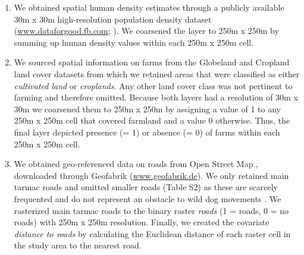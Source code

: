 \documentclass[abstract=off,10pt,a4paper,bibliography=totocnumbered]{article}
\begin{document}
\begin{enumerate}[label = (\arabic*)]

  \item We obtained spatial human density estimates through a publicly available
  30m x 30m high-resolution population density dataset
  (\url{www.dataforgood.fb.com}; \citealp{Facebook.2019}). We coarsened the
  layer to 250m x 250m by summing up human density values within each 250m x
  250m cell.

  \item We sourced spatial information on farms from the Globeland
  \citep{Chen.2015} and Cropland \citep{Xiong.2017} land cover datasets from
  which we retained areas that were classified as either \textit{cultivated
  land} or \textit{croplands}. Any other land cover class was not pertinent to
  farming and therefore omitted. Because both layers had a resolution of 30m x
  30m we coarsened them to 250m x 250m by assigning a value of 1 to any 250m x
  250m cell that covered farmland and a value 0 otherwise. Thus, the final layer
  depicted presence (= 1) or absence (= 0) of farms within each 250m x 250m
  cell.

  \item We obtained geo-referenced data on roads from Open Street Map
  \citep{OpenStreetMap.2019}, downloaded through Geofabrik
  (\url{www.geofabrik.de}). We only retained main tarmac roads and omitted
  smaller roads (Table S2) as these are scarcely frequented and do not represent
  an obstacle to wild dog movements \citep{Abrahms.2016}. We rasterized main
  tarmac roads to the binary raster \textit{roads} (1 = roads, 0 = no roads)
  with 250m x 250m resolution. Finally, we created the covariate
  \textit{distance to roads} by calculating the Euclidean distance of each
  raster cell in the study area to the nearest road.

\end{enumerate}
\end{document}
